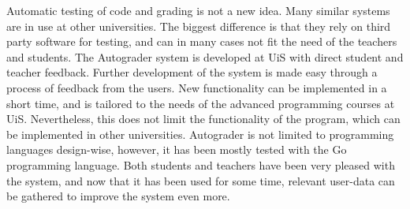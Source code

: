 Automatic testing of code and grading is not a new idea. Many similar systems are in use at other universities. The biggest difference is that they rely on third party software for testing, and can in many cases not fit the need of the teachers and students. The Autograder system is developed at UiS with direct student and teacher feedback. Further development of the system is made easy through a process of feedback from the users. New functionality can be implemented in a short time, and is tailored to the needs of the advanced programming courses at UiS. Nevertheless, this does not limit the functionality of the program, which can be implemented in other universities. Autograder is not limited to programming languages design-wise, however, it has been mostly tested with the Go programming language. Both students and teachers have been very pleased with the system, and now that it has been used for some time, relevant user-data can be gathered to improve the system even more.